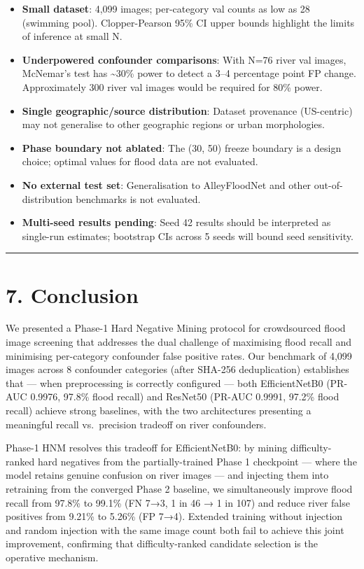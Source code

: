\documentclass[
  11pt,
]{article}
\providecommand{\tightlist}{%
  \setlength{\itemsep}{0pt}\setlength{\parskip}{0pt}}
\begin{document}
\begin{itemize}
\tightlist
\item
  \textbf{Small dataset}: 4,099 images; per-category val counts as low
  as 28 (swimming pool). Clopper-Pearson 95\% CI upper bounds highlight
  the limits of inference at small N.
\item
  \textbf{Underpowered confounder comparisons}: With N=76 river val
  images, McNemar's test has \textasciitilde30\% power to detect a 3--4
  percentage point FP change. Approximately 300 river val images would
  be required for 80\% power.
\item
  \textbf{Single geographic/source distribution}: Dataset provenance
  (US-centric) may not generalise to other geographic regions or urban
  morphologies.
\item
  \textbf{Phase boundary not ablated}: The (30, 50) freeze boundary is a
  design choice; optimal values for flood data are not evaluated.
\item
  \textbf{No external test set}: Generalisation to AlleyFloodNet and
  other out-of-distribution benchmarks is not evaluated.
\item
  \textbf{Multi-seed results pending}: Seed 42 results should be
  interpreted as single-run estimates; bootstrap CIs across 5 seeds will
  bound seed sensitivity.
\end{itemize}

\begin{center}\rule{0.5\linewidth}{0.5pt}\end{center}

\section{7. Conclusion}\label{conclusion}

We presented a Phase-1 Hard Negative Mining protocol for crowdsourced
flood image screening that addresses the dual challenge of maximising
flood recall and minimising per-category confounder false positive
rates. Our benchmark of 4,099 images across 8 confounder categories
(after SHA-256 deduplication) establishes that --- when preprocessing is
correctly configured --- both EfficientNetB0 (PR-AUC 0.9976, 97.8\%
flood recall) and ResNet50 (PR-AUC 0.9991, 97.2\% flood recall) achieve
strong baselines, with the two architectures presenting a meaningful
recall vs.~precision tradeoff on river confounders.

Phase-1 HNM resolves this tradeoff for EfficientNetB0: by mining
difficulty-ranked hard negatives from the partially-trained Phase 1
checkpoint --- where the model retains genuine confusion on river images
--- and injecting them into retraining from the converged Phase 2
baseline, we simultaneously improve flood recall from 97.8\% to 99.1\%
(FN 7→3, 1 in 46 → 1 in 107) and reduce river false positives from
9.21\% to 5.26\% (FP 7→4). Extended training without injection and
random injection with the same image count both fail to achieve this
joint improvement, confirming that difficulty-ranked candidate selection
is the operative mechanism.
\end{document}
